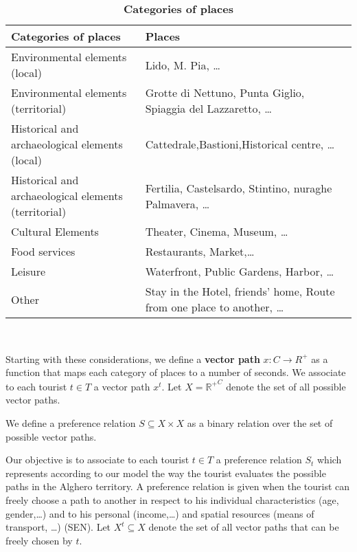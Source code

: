\documentclass[a4paper]{article}
\begin{document}
\begin{table}[h]
\begin{tabular}{ll}
\hline
\textbf{Categories of places}&\textbf{Places}\\
\hline
\parbox{5cm}{Environmental elements (local)}&\parbox{6cm}{Lido, M. Pia, \dots}\\
\parbox{5cm}{Environmental elements (territorial)}&\parbox{6cm}{Grotte di Nettuno, Punta Giglio, Spiaggia del Lazzaretto, \dots}\\
\parbox{5cm}{Historical and archaeological elements (local)}&\parbox{6cm}{Cattedrale,Bastioni,Historical centre, \dots}\\
\parbox{5cm}{Historical and archaeological elements (territorial)}&\parbox{6cm}{Fertilia, Castelsardo, Stintino, nuraghe Palmavera, \dots}\\
\parbox{5cm}{Cultural Elements}&\parbox{6cm}{Theater, Cinema, Museum, \dots}\\
\parbox{5cm}{Food services}&\parbox{6cm}{Restaurants, Market,\dots}\\
\parbox{5cm}{Leisure}&\parbox{6cm}{Waterfront, Public Gardens, Harbor, \dots}\\
\parbox{5cm}{Other}&\parbox{6cm}{Stay in the Hotel, friends' home, Route from one place to another, \dots}\\
\hline
\end{tabular}

\caption{\textbf{Categories of places}}\
\label{Table1}
\end{table}

Starting with these considerations, we define a \textbf{vector path} $x: C \rightarrow R^+$ as a function that maps each category of places to a number of seconds.
We associate to each tourist $t \in T $ a vector path $x^t$.
Let $X={\mathbb{R}^+}^C$ denote the set of all possible vector paths.

We define a preference relation $S \subseteq X \times X $ as a binary relation over the set of possible vector paths.

Our objective is to associate to each tourist $t \in T$ a preference relation $S_t$ which represents according to our model the way the tourist evaluates the possible paths in the Alghero territory. A preference relation is given when the tourist can freely choose a path to another in respect to his individual characteristics (age, gender,\dots) and to his personal (income,\dots) and spatial resources (means of transport, \dots) (SEN). Let $X^t {\subseteq}X$ denote the set of all vector paths that can be freely  chosen by $t$.
\end{document}
